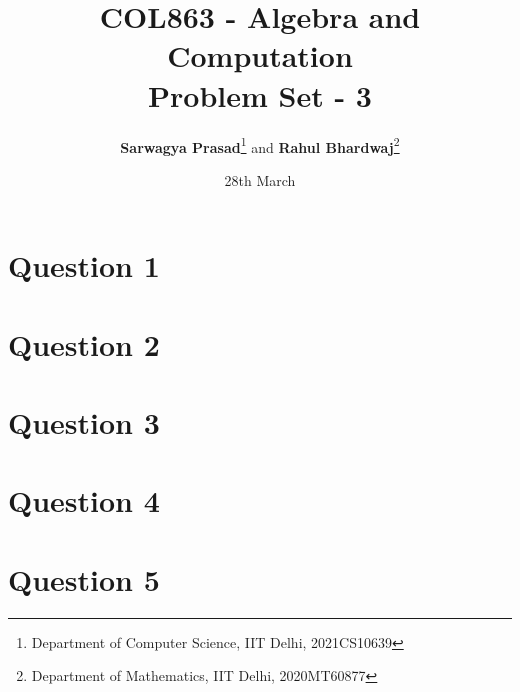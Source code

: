 \documentclass[tikz,
	10pt,
	parskip=half-,		
	paper=a4,			
	english	
	]{scrartcl}
\title{COL863 - Algebra and Computation \\ Problem Set - 3}
\author{\textbf{Sarwagya Prasad}\thanks{Department of Computer Science, IIT Delhi, 2021CS10639} and \textbf{Rahul Bhardwaj}\thanks{Department of Mathematics, IIT Delhi, 2020MT60877}}
\date{28th March}
\begin{document}
\maketitle			
\tableofcontents
\newpage

\section{Question 1}

\newpage
\section{Question 2}

\newpage
\section{Question 3}

\newpage
\section{Question 4}

\newpage
\section{Question 5}

\newpage
\end{document}
